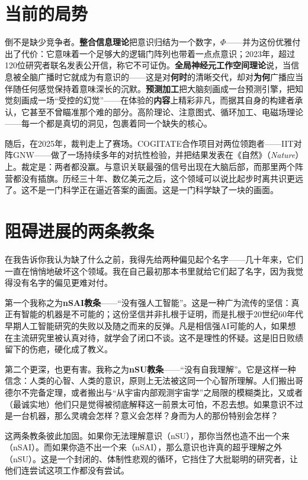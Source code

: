 \documentclass[11pt, twoside, openright]{book}
\begin{document}
\section*{当前的局势}

倒不是缺少竞争者。\textbf{整合信息理论}把意识归结为一个数字，$\Phi$------并为这份优雅付出了代价：它意味着一个足够大的逻辑门阵列也带着一点点意识；2023年，超过120位研究者联名发表公开信，称它不可证伪。\textbf{全局神经元工作空间理论}说，当信息被全脑广播时它就成为有意识的------这是对\textbf{何时}的清晰交代，却对\textbf{为何}广播应当伴随任何感觉保持着意味深长的沉默。\textbf{预测加工}把大脑刻画成一台预测引擎，把知觉刻画成一场“受控的幻觉”------在体验的\textbf{内容}上精彩非凡，而据其自身的构建者承认，它甚至不曾瞄准那个难的部分。高阶理论、注意图式、循环加工、电磁场理论------每一个都是真切的洞见，包裹着同一个缺失的核心。

随后，在2025年，裁判走上了赛场。COGITATE合作项目对两位领跑者------IIT对阵GNW------做了一场持续多年的对抗性检验，并把结果发表在《自然》（\textit{Nature}）上。裁定是：两者都没赢。与意识关联最强的信号出现在大脑后部，而那里两个阵营都没有插旗。历经三十年、数亿美元之后，这个领域可以说比起步时离共识更远了。这不是一门科学正在逼近答案的画面。这是一门科学缺了一块的画面。

\section*{阻碍进展的两条教条}

在我告诉你我认为缺了什么之前，我得先给两种偏见起个名字------几十年来，它们一直在悄悄地破坏这个领域。我在自己最初那本书里就给它们起了名字，因为我觉得没有名字的偏见更难对付。

第一个我称之为\textbf{nSAI教条}------“没有强人工智能”。这是一种广为流传的坚信：真正有智能的机器是不可能的；这份坚信并非扎根于证明，而是扎根于20世纪60年代早期人工智能研究的失败以及随之而来的反弹。凡是相信强AI可能的人，如果想在主流研究里被认真对待，就学会了闭口不谈。这不是理性的怀疑。这是旧日败绩留下的伤疤，硬化成了教义。

第二个更深，也更有害。我称之为\textbf{nSU教条}------“没有自我理解”。它是这样一种信念：人类的心智、人类的意识，原则上无法被这同一个心智所理解。人们搬出哥德尔不完备定理，或者搬出与“从宇宙内部观测宇宙学”之局限的模糊类比，又或者（最诚实地）他们只是觉得被彻底解释这一前景太可怕，不忍去想。如果意识不过是一台机器，那么灵魂会怎样？意义会怎样？身而为人的那份特别会怎样？

这两条教条彼此加固。如果你无法理解意识（nSU），那你当然也造不出一个来（nSAI）。而如果你造不出一个来（nSAI），那么意识也许真的超乎理解之外（nSU）。这是一个封闭的、体制性悲观的循环，它挡住了大批聪明的研究者，让他们连尝试这项工作都没有尝试。
\end{document}
